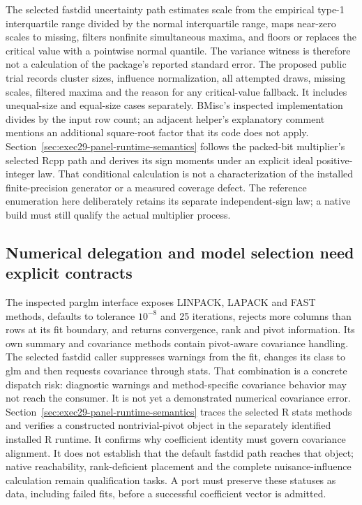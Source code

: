 The selected fastdid uncertainty path estimates scale from the empirical type-1 interquartile range divided by the normal interquartile range, maps near-zero scales to missing, filters nonfinite simultaneous maxima, and floors or replaces the critical value with a pointwise normal quantile. The variance witness is therefore not a calculation of the package's reported standard error. The proposed public trial records cluster sizes, influence normalization, all attempted draws, missing scales, filtered maxima and the reason for any critical-value fallback. It includes unequal-size and equal-size cases separately. BMisc's inspected implementation divides by the input row count; an adjacent helper's explanatory comment mentions an additional square-root factor that its code does not apply. Section~\ref{sec:exec29-panel-runtime-semantics} follows the packed-bit multiplier's selected Rcpp path and derives its sign moments under an explicit ideal positive-integer law. That conditional calculation is not a characterization of the installed finite-precision generator or a measured coverage defect. The reference enumeration here deliberately retains its separate independent-sign law; a native build must still qualify the actual multiplier process.~\citep{exec28_panel_delegates,exec29_panel_inference_sources,exec29_panel_inference_reference}

\subsection{Numerical delegation and model selection need explicit contracts}

The inspected parglm interface exposes LINPACK, LAPACK and FAST methods, defaults to tolerance $10^{-8}$ and 25 iterations, rejects more columns than rows at its fit boundary, and returns convergence, rank and pivot information. Its own summary and covariance methods contain pivot-aware covariance handling. The selected fastdid caller suppresses warnings from the fit, changes its class to glm and then requests covariance through stats. That combination is a concrete dispatch risk: diagnostic warnings and method-specific covariance behavior may not reach the consumer. It is not yet a demonstrated numerical covariance error. Section~\ref{sec:exec29-panel-runtime-semantics} traces the selected R stats methods and verifies a constructed nontrivial-pivot object in the separately identified installed R runtime. It confirms why coefficient identity must govern covariance alignment. It does not establish that the default fastdid path reaches that object; native reachability, rank-deficient placement and the complete nuisance-influence calculation remain qualification tasks. A port must preserve these statuses as data, including failed fits, before a successful coefficient vector is admitted.~\citep{exec28_panel_estimator_sources,exec29_panel_inference_sources}

